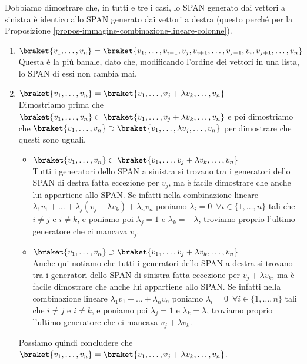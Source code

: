 \documentclass[11pt, a4paper, titlepage, oneside]{scrbook}
\begin{document}
Dobbiamo dimostrare che, in tutti e tre i casi, lo SPAN generato dai vettori a sinistra è identico allo SPAN generato dai vettori a destra (questo perché per la Proposizione \ref{propos-immagine-combinazione-lineare-colonne}).
\begin{enumerate}
    \item $\braket{v_1, \ldots, v_n} = \braket{v_1, \ldots, v_{i-1}, v_j, v_{i+1}, \ldots, v_{j-1}, v_i, v_{j+1}, \ldots, v_n}$ \\ 
    Questa è la più banale, dato che, modificando l'ordine dei vettori in una lista, lo SPAN di essi non cambia mai.
    \item  $\braket{v_1, \ldots, v_n} = \braket{v_1, \ldots, v_j + \lambda v_k, \ldots, v_n}$ \\
    Dimostriamo prima che $\braket{v_1, \ldots, v_n} \subset \braket{v_1, \ldots, v_j + \lambda v_k, \ldots, v_n}$ e poi dimostriamo che $\braket{v_1, \ldots, v_n} \supset \braket{v_1, \ldots, \lambda v_j, \ldots, v_n}$ per dimostrare che questi sono uguali.
    \begin{itemize}
        \item $\braket{v_1, \ldots, v_n} \subset \braket{v_1, \ldots, v_j + \lambda v_k, \ldots, v_n}$ \\
        Tutti i generatori dello SPAN a sinistra si trovano tra i generatori dello SPAN di destra fatta eccezione per $v_j$, ma è facile dimostrare che anche lui appartiene allo SPAN. Se infatti nella combinazione lineare $\lambda_1 v_1 + \ldots + \lambda_j (v_j + \lambda v_k) + \lambda_n v_n$ poniamo \mbox{$\lambda_i = 0 \enspace \forall i \in \{1, \ldots, n\}$} tali che $i \neq j$ e $i \neq k$, e poniamo poi $\lambda_j = 1$ e $\lambda_k = -\lambda$, troviamo proprio l'ultimo generatore che ci mancava $v_j$. 
        \item $\braket{v_1, \ldots, v_n} \supset \braket{v_1, \ldots, v_j + \lambda v_k, \ldots, v_n}$ \\
        Anche qui notiamo che tutti i generatori dello SPAN a destra si trovano tra i generatori dello SPAN di sinistra fatta eccezione per $v_j + \lambda v_k$, ma è facile dimostrare che anche lui appartiene allo SPAN. Se infatti nella combinazione lineare $\lambda_1 v_1 + \ldots + \lambda_n v_n$ poniamo \mbox{$\lambda_i = 0 \enspace \forall i \in \{1, \ldots, n\}$} tali che $i \neq j$ e $i \neq k$, e poniamo poi $\lambda_j = 1$ e $\lambda_k = \lambda$, troviamo proprio l'ultimo generatore che ci mancava $v_j + \lambda v_k$. 
    \end{itemize}
    Possiamo quindi concludere che $\braket{v_1, \ldots, v_n} = \braket{v_1, \ldots, v_j + \lambda v_k, \ldots, v_n}$.

\end{enumerate}
\end{document}

